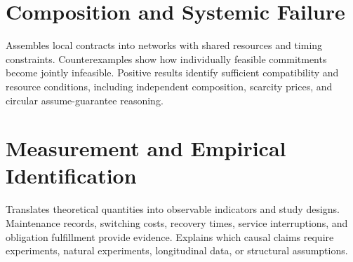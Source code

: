 \chapter{Composition and Systemic Failure}\label{ch:44}
Assembles local contracts into networks with shared resources and timing constraints. Counterexamples show how individually feasible commitments become jointly infeasible. Positive results identify sufficient compatibility and resource conditions, including independent composition, scarcity prices, and circular assume-guarantee reasoning.
\scaffold

\chapter{Measurement and Empirical Identification}\label{ch:45}
Translates theoretical quantities into observable indicators and study designs. Maintenance records, switching costs, recovery times, service interruptions, and obligation fulfillment provide evidence. Explains which causal claims require experiments, natural experiments, longitudinal data, or structural assumptions.
\scaffold
